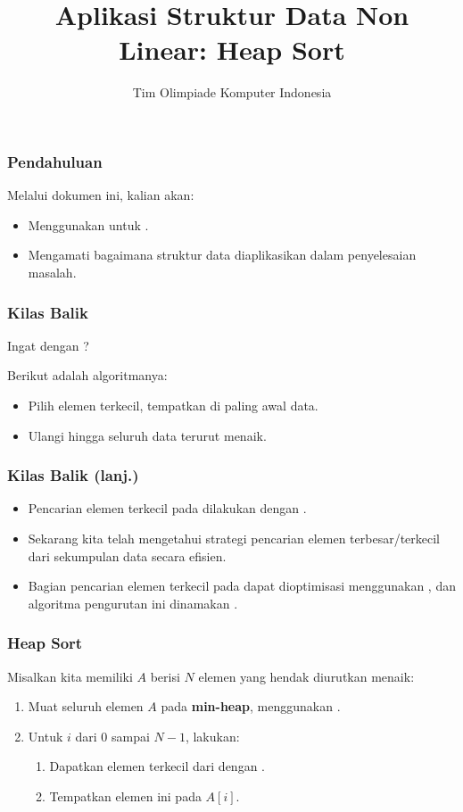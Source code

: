 

\title{Aplikasi Struktur Data Non Linear: \newline Heap Sort}
\author{Tim Olimpiade Komputer Indonesia}
\date{}



\begin{frame}
\titlepage
\end{frame}

\begin{frame}
\frametitle{Pendahuluan}
Melalui dokumen ini, kalian akan:
\begin{itemize}
  \item Menggunakan \pheap untuk \pHeapSort.
  \item Mengamati bagaimana struktur data diaplikasikan dalam penyelesaian masalah.
\end{itemize}
\end{frame}

\begin{frame}
\frametitle{Kilas Balik}
Ingat dengan ?\newline

Berikut adalah algoritmanya:
\begin{itemize}
  \item Pilih elemen terkecil, tempatkan di paling awal data.
  \item Ulangi hingga seluruh data terurut menaik.
\end{itemize}
\end{frame}

\begin{frame}
\frametitle{Kilas Balik (lanj.)}
\begin{itemize}
  \item Pencarian elemen terkecil pada  dilakukan dengan .
  \item Sekarang kita telah mengetahui strategi pencarian elemen terbesar/terkecil dari sekumpulan data secara efisien.
  \item Bagian pencarian elemen terkecil pada  dapat dioptimisasi menggunakan \pheap, dan algoritma pengurutan ini dinamakan \textbf{\pHeapSort}.
\end{itemize}
\end{frame}

\begin{frame}
\frametitle{Heap Sort}
Misalkan kita memiliki \farray $A$ berisi $N$ elemen yang hendak diurutkan menaik:
\begin{enumerate}
  \item Muat seluruh elemen \farray $A$ pada \textbf{min-heap}, menggunakan .
  \item Untuk $i$ dari $0$ sampai $N-1$, lakukan:
  \begin{enumerate}
    \item Dapatkan elemen terkecil dari \pheap dengan .
    \item Tempatkan elemen ini pada $A[i]$.
  \end{enumerate}
\end{enumerate}
\end{frame}

